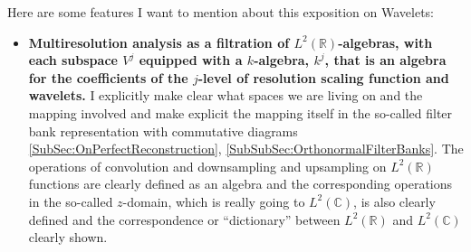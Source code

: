 \documentclass[twoside]{amsart}
\theoremstyle{plain}
\theoremstyle{definition}
\theoremstyle{remark}
\numberwithin{equation}{section}
\begin{document}
Here are some features I want to mention about this exposition on Wavelets:
\begin{itemize}
\item \textbf{Multiresolution analysis as a filtration of $L^2(\mathbb{R})$-algebras, with each subspace $V^j$ equipped with a $k$-algebra, $k^j$, that is an algebra for the coefficients of the $j$-level of resolution scaling function and wavelets.}  I explicitly make clear what spaces we are living on and the mapping involved and make explicit the mapping itself in the so-called filter bank representation with commutative diagrams \ref{SubSec:OnPerfectReconstruction}, \ref{SubSubSec:OrthonormalFilterBanks}.  The operations of convolution and downsampling and upsampling on $L^2(\mathbb{R})$ functions are clearly defined as an algebra and the corresponding operations in the so-called $z$-domain, which is really going to $L^2(\mathbb{C})$, is also clearly defined and the correspondence or ``dictionary'' between $L^2(\mathbb{R})$ and $L^2(\mathbb{C})$ clearly shown. 


\end{itemize}
\end{document}
